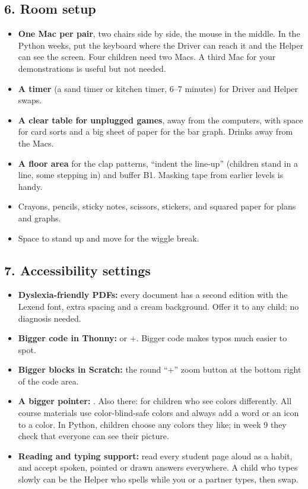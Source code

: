 \documentclass[track=junior,level=3,teacher]{kidscode}
\begin{document}
\subsection{6. Room setup}
\begin{itemize}[itemsep=2pt]
  \item \textbf{One Mac per pair}, two chairs side by side, the mouse in the middle. In the Python
        weeks, put the keyboard where the Driver can reach it and the Helper can see the screen.
        Four children need two Macs. A third Mac for your demonstrations is useful but not needed.
  \item \textbf{A timer} (a sand timer or kitchen timer, 6--7 minutes) for Driver and Helper swaps.
  \item \textbf{A clear table for unplugged games}, away from the computers, with space for card sorts
        and a big sheet of paper for the bar graph. Drinks away from the Macs.
  \item \textbf{A floor area} for the clap patterns, \enquote{indent the line-up} (children stand in a
        line, some stepping in) and buffer B1. Masking tape from earlier levels is handy.
  \item Crayons, pencils, sticky notes, scissors, stickers, and squared paper for plans and graphs.
  \item Space to stand up and move for the wiggle break.
\end{itemize}

\subsection{7. Accessibility settings}
\begin{itemize}[itemsep=3pt]
  \item \textbf{Dyslexia-friendly PDFs:} every document has a second edition with the Lexend font,
        extra spacing and a cream background. Offer it to any child; no diagnosis needed.
  \item \textbf{Bigger code in Thonny:}  or +\keys{+}.
        Bigger code makes typos much easier to spot.
  \item \textbf{Bigger blocks in Scratch:} the round \enquote{+} zoom button at the bottom right of the code area.
  \item \textbf{A bigger pointer:} .
        Also there:  for children who see colors differently. All course materials
        use color-blind-safe colors and always add a word or an icon to a color. In Python, children
        choose any colors they like; in week 9 they check that everyone can see their picture.
  \item \textbf{Reading and typing support:} read every student page aloud as a habit, and accept
        spoken, pointed or drawn answers everywhere. A child who types slowly can be the Helper who
        spells while you or a partner types, then swap.
\end{itemize}
\end{document}
